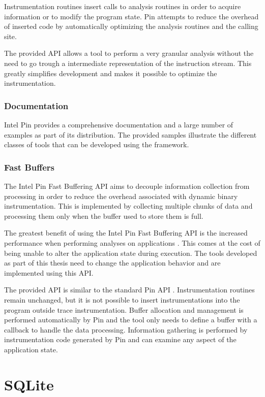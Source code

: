Instrumentation routines insert calls to analysis routines in order to acquire information or to modify the program state. Pin attempts to reduce the overhead of inserted code by automatically optimizing the analysis routines and the calling site.

The provided API allows a tool to perform a very granular analysis without the need to go trough a intermediate representation of the instruction stream. This greatly simplifies development and makes it possible to optimize the instrumentation.

\subsubsection{Documentation}

Intel Pin provides a comprehensive documentation \cite{pindoc} and a large number of examples as part of its distribution. The provided samples illustrate the different classes of tools that can be developed using the framework.

\subsubsection{Fast Buffers}

The Intel Pin Fast Buffering API \cite{pinbuffer} aims to decouple information collection from processing in order to reduce the overhead associated with dynamic binary instrumentation. This is implemented by collecting multiple chunks of data and processing them only when the buffer used to store them is full.

The greatest benefit of using the Intel Pin Fast Buffering API is the increased performance when performing analyses on applications \cite{pinbuffer}. This comes at the cost of being unable to alter the application state during execution. The tools developed as part of this thesis need to change the application behavior and are implemented using this API.

The provided API is similar to the standard Pin API \cite{pindoc}. Instrumentation routines remain unchanged, but it is not possible to insert instrumentations into the program outside trace instrumentation. Buffer allocation and management is performed automatically by Pin and the tool only needs to define a buffer with a callback to handle the data processing. Information gathering is performed by instrumentation code generated by Pin and can examine any aspect of the application state.

\section{SQLite}

